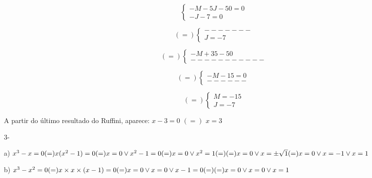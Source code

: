 \documentclass[11pt]{article}
\begin{document}
\begin{minipage}{0.3\textwidth}
	\[\left\{
		\begin{array}{lr}
    		-M-5J-50=0\\
    		-J-7=0
  		\end{array}
	\right.
	\]
\end{minipage}%
\begin{minipage}{0.3\textwidth}
	\[(=)\left\{
		\begin{array}{lr}
    		-------\\
    		J=-7
  		\end{array}
	\right.
	\]					
\end{minipage}
\begin{minipage}{0.3\textwidth}
	\[(=)\left\{
		\begin{array}{lr}
    		-M+35-50\\
    		-----------
  		\end{array}
	\right.
	\]			
\end{minipage}

\begin{minipage}{0.3\textwidth}
	\[(=)\left\{
		\begin{array}{lr}
    		-M-15=0\\
    		------
  		\end{array}
	\right.
	\]
\end{minipage}%
\begin{minipage}{0.3\textwidth}
	\[(=)\left\{
		\begin{array}{lr}
    		M=-15\\
    		J=-7
  		\end{array}
	\right.
	\]					
\end{minipage}

\vspace{5mm}
A partir do último resultado do Ruffini, aparece:
$x-3=0$ \hspace{1mm} $(=)$ \hspace{1mm} $x=3$\\

\vspace{5mm}

{\large 3-}

a) $x^3-x=0 (=) x(x^2-1)=0 (=) x=0 \lor x^2-1=0 (=) x=0 \lor x^2=1 (=) \break  (=) x=0 \lor x=\pm\sqrt{1} (=) x=0 \lor x=-1 \lor x=1$
\vspace{5mm}

b) $x^3-x^2=0 (=) x\times x\times (x-1) =0 (=) x=0 \lor x=0 \lor x-1 =0 (=)\break (=) x=0 \lor x=0 \lor x=1$
\vspace{5mm}
\end{document}
